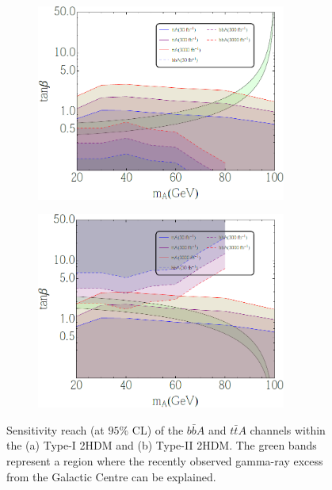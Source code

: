 \begin{figure}[htb!]
\centering
\begin{subfigure}{0.45\textwidth}
  \centering
  \includegraphics[width=0.9\textwidth]{figures/ttA/fig7a.png}
  \caption{}
  \label{}
\end{subfigure}
\begin{subfigure}{0.45\textwidth}
  \centering
  \includegraphics[width=0.9\textwidth]{figures/ttA/fig7b.png}
  \caption{}
  \label{}
\end{subfigure}
\captionsetup{width=0.85\textwidth} \caption{\small Sensitivity reach (at $95\%$ CL) of the $b\bar{b}A$ and  $t\bar{t}A$ channels within the (a) Type-I 2HDM and (b) Type-II 2HDM. The green bands represent a region where the recently observed gamma-ray excess from the Galactic Centre can be explained.}
\label{sec:ttA:fig:2hdm}
\end{figure}


